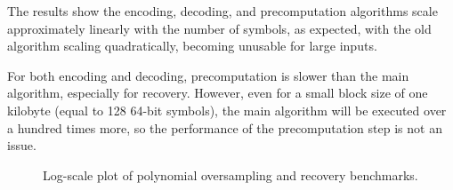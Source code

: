 The results show the encoding, decoding, and precomputation algorithms scale approximately linearly with the number of symbols, as expected, with the old algorithm scaling quadratically, becoming unusable for large inputs.

For both encoding and decoding, precomputation is slower than the main algorithm, especially for recovery.
However, even for a small block size of one kilobyte (equal to 128 64-bit symbols), the main algorithm will be executed over a hundred times more, so the performance of the precomputation step is not an issue.

\begin{figure}[!hbt]
\begin{center}

\end{center}
\caption{Log-scale plot of polynomial oversampling and recovery benchmarks.}
\end{figure}
